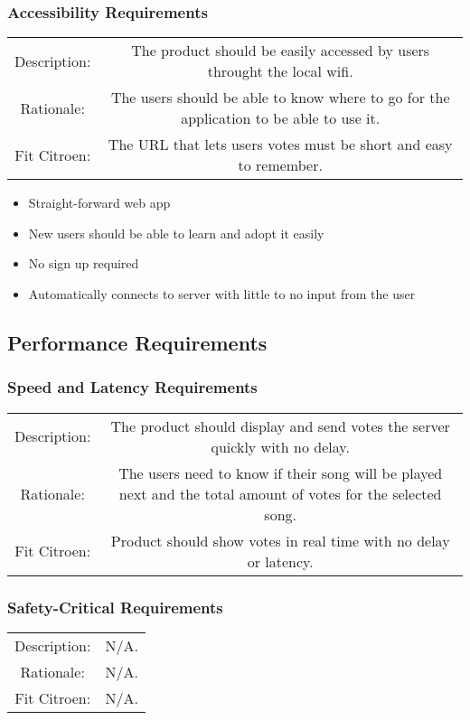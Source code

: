 \documentclass[12pt, titlepage]{article}
\begin{document}
\subsubsection{Accessibility Requirements}
\begin{center}
\begin{tabular}{| c | c | }
\hline
Description: &The product should be easily accessed by users throught the local wifi.\\ 
Rationale: & The users should be able to know where to go for the application to be able to use it.\\
Fit Citroen: & The URL that lets users votes must be short and easy to remember. \\
\hline
\end{tabular}
\end{center}

\begin{itemize}
\item Straight-forward web app
\item New users should be able to learn and adopt it easily
\item No sign up required
\item Automatically connects to server with little to no input from the user
\end{itemize}

\subsection{Performance Requirements}
\subsubsection{Speed and Latency Requirements}
\begin{center}
\begin{tabular}{| c | c | }
\hline
Description: &The product should display and send votes the server quickly with no delay.\\ 
Rationale: & The users need to know if their song will be played next and the total amount of votes for the selected song.\\
Fit Citroen: & Product should show votes in real time with no delay or latency. \\
\hline
\end{tabular}
\end{center}
\subsubsection{Safety-Critical Requirements}
\begin{center}
\begin{tabular}{| c | c | }
\hline
Description: &N/A.\\ 
Rationale: & N/A.\\
Fit Citroen: & N/A. \\
\hline
\end{tabular}
\end{center}
\end{document}
